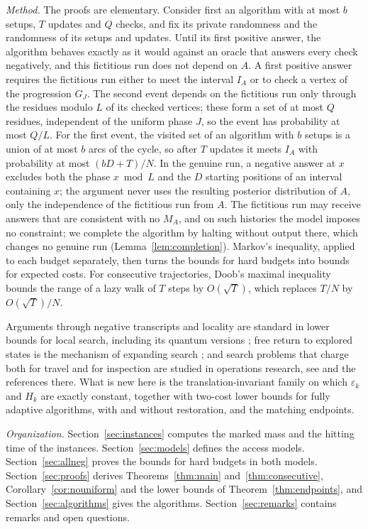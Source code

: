 \documentclass{amsart}
\theoremstyle{plain}
\theoremstyle{definition}
\theoremstyle{remark}
\newcommand{\eps}{\varepsilon}
\begin{document}
\emph{Method.}
The proofs are elementary. Consider first an algorithm with at most $b$ setups, $T$ updates and $Q$ checks, and fix its private randomness and the randomness of its setups and updates. Until its first positive answer, the algorithm behaves exactly as it would against an oracle that answers every check negatively, and this fictitious run does not depend on $A$. A first positive answer requires the fictitious run either to meet the interval $I_A$ or to check a vertex of the progression $G_J$. The second event depends on the fictitious run only through the residues modulo $L$ of its checked vertices; these form a set of at most $Q$ residues, independent of the uniform phase $J$, so the event has probability at most $Q/L$. For the first event, the visited set of an algorithm with $b$ setups is a union of at most $b$ arcs of the cycle, so after $T$ updates it meets $I_A$ with probability at most $(bD+T)/N$. In the genuine run, a negative answer at $x$ excludes both the phase $x\bmod L$ and the $D$ starting positions of an interval containing $x$; the argument never uses the resulting posterior distribution of $A$, only the independence of the fictitious run from $A$. The fictitious run may receive answers that are consistent with no $M_A$, and on such histories the model imposes no constraint; we complete the algorithm by halting without output there, which changes no genuine run (Lemma~\ref{lem:completion}). Markov's inequality, applied to each budget separately, then turns the bounds for hard budgets into bounds for expected costs. For consecutive trajectories, Doob's maximal inequality bounds the range of a lazy walk of $T$ steps by $O(\sqrt T)$, which replaces $T/N$ by $O(\sqrt T)/N$.

Arguments through negative transcripts and locality are standard in lower bounds for local search, including its quantum versions \cite{AA}; free return to explored states is the mechanism of expanding search \cite{AL}; and search problems that charge both for travel and for inspection are studied in operations research, see \cite{BK} and the references there. What is new here is the translation-invariant family on which $\eps_k$ and $H_k$ are exactly constant, together with two-cost lower bounds for fully adaptive algorithms, with and without restoration, and the matching endpoints.

\emph{Organization.}
Section~\ref{sec:instances} computes the marked mass and the hitting time of the instances. Section~\ref{sec:models} defines the access models. Section~\ref{sec:allneg} proves the bounds for hard budgets in both models. Section~\ref{sec:proofs} derives Theorems~\ref{thm:main} and~\ref{thm:consecutive}, Corollary~\ref{cor:nouniform} and the lower bounds of Theorem~\ref{thm:endpoints}, and Section~\ref{sec:algorithms} gives the algorithms. Section~\ref{sec:remarks} contains remarks and open questions.
\end{document}
